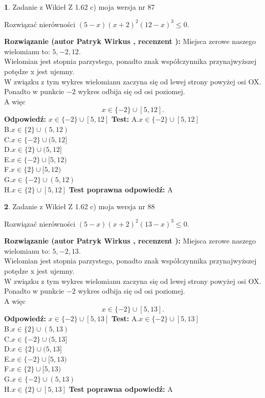 \documentclass[12pt, a4paper]{article}
\theoremstyle{definition} %
\newtheorem{zad}{}
\newcommand{\zadStart}[1]{\begin{zad}#1\newline}
\newcommand{\zadStop}{\end{zad}}
\newcommand{\rozwStart}[2]{\noindent \textbf{Rozwiązanie (autor #1 , recenzent #2): }\newline}
\newcommand{\rozwStop}{\newline}
\newcommand{\odpStart}{\noindent \textbf{Odpowiedź:}\newline}
\newcommand{\odpStop}{\newline}
\newcommand{\testStart}{\noindent \textbf{Test:}\newline}
\newcommand{\testStop}{\newline}
\newcommand{\kluczStart}{\noindent \textbf{Test poprawna odpowiedź:}\newline}
\newcommand{\kluczStop}{\newline}
\begin{document}
\zadStart{Zadanie z Wikieł Z 1.62 c) moja wersja nr 87}

Rozwiązać nierówności $(5-x)(x+2)^{2}(12-x)^{3}\le0$.
\zadStop
\rozwStart{Patryk Wirkus}{}
Miejsca zerowe naszego wielomianu to: $5, -2, 12$.\\
Wielomian jest stopnia parzystego, ponadto znak współczynnika przy\linebreak najwyższej potędze x jest ujemny.\\ W związku z tym wykres wielomianu zaczyna się od lewej strony powyżej osi OX.\\
Ponadto w punkcie $-2$ wykres odbija się od osi poziomej.\\
A więc $$x \in \{-2\} \cup [5,12].$$
\rozwStop
\odpStart
$x \in \{-2\} \cup [5,12]$
\odpStop
\testStart
A.$x \in \{-2\} \cup [5,12]$\\
B.$x \in \{2\} \cup (5,12)$\\
C.$x \in \{-2\} \cup (5,12]$\\
D.$x \in \{2\} \cup (5,12]$\\
E.$x \in \{-2\} \cup [5,12)$\\
F.$x \in \{2\} \cup [5,12)$\\
G.$x \in \{-2\} \cup (5,12)$\\
H.$x \in \{2\} \cup [5,12]$
\testStop
\kluczStart
A
\kluczStop



\zadStart{Zadanie z Wikieł Z 1.62 c) moja wersja nr 88}

Rozwiązać nierówności $(5-x)(x+2)^{2}(13-x)^{3}\le0$.
\zadStop
\rozwStart{Patryk Wirkus}{}
Miejsca zerowe naszego wielomianu to: $5, -2, 13$.\\
Wielomian jest stopnia parzystego, ponadto znak współczynnika przy\linebreak najwyższej potędze x jest ujemny.\\ W związku z tym wykres wielomianu zaczyna się od lewej strony powyżej osi OX.\\
Ponadto w punkcie $-2$ wykres odbija się od osi poziomej.\\
A więc $$x \in \{-2\} \cup [5,13].$$
\rozwStop
\odpStart
$x \in \{-2\} \cup [5,13]$
\odpStop
\testStart
A.$x \in \{-2\} \cup [5,13]$\\
B.$x \in \{2\} \cup (5,13)$\\
C.$x \in \{-2\} \cup (5,13]$\\
D.$x \in \{2\} \cup (5,13]$\\
E.$x \in \{-2\} \cup [5,13)$\\
F.$x \in \{2\} \cup [5,13)$\\
G.$x \in \{-2\} \cup (5,13)$\\
H.$x \in \{2\} \cup [5,13]$
\testStop
\kluczStart
A
\kluczStop
\end{document}
